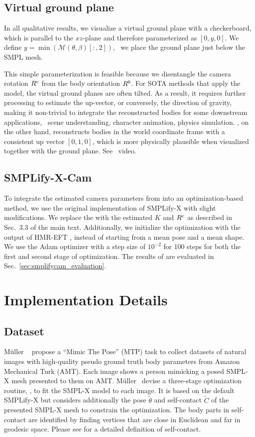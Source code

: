 \documentclass[10pt,twocolumn,letterpaper,usenames,dvipsnames]{article}
\begin{document}
\subsection{Virtual ground plane}
In all qualitative results, we visualize a virtual ground plane with a checkerboard, 
which is parallel to the $xz$-plane and therefore parameterized as $[0,y,0]$.
We define $y=\min\left(\mathcal{M}(\theta, \beta)[:,2]\right)$, \ie~we place the ground plane just below the SMPL mesh. 

This simple parameterization is feasible because we disentangle the camera rotation $R^c$ from the body orientation $R^b$.
For SOTA methods that apply the \iwcam model, the virtual ground planes are often tilted.
As a result, it requires further processing to estimate the up-vector, or conversely, the direction of gravity, 
making it non-trivial to integrate the reconstructed bodies for some downstream applications, \eg~scene understanding, character animation, physics simulation. 
\methodname, on the other hand, reconstructs bodies in the world coordinate frame with a consistent up vector $[0,1,0]$, 
which is more physically plausible when visualized together with the ground plane. See \supmat~video.

\subsection{SMPLify-X-Cam} 
To integrate the estimated camera parameters from \camcalib into an optimization-based method, 
we use the original implementation of SMPLify-X \cite{SMPL-X:2019} with slight modifications. 
We replace the \iwcam with the estimated $K$ and $R^c$ as described in Sec.~3.3 of the main text.
Additionally, we initialize the optimization with the output of HMR-EFT \cite{joo2020eft}, instead of starting from a mean pose and a mean shape.
We use the Adam optimizer with a step size of $10^{-2}$ for 100 steps for both the first and second stage of optimization.
The results of \smplify are evaluated in Sec.~\ref{sec:smplifycam_evaluation}.

\section{Implementation Details}
\subsection{\mtpcam Dataset}
M\"uller \etal~\cite{Mueller:CVPR:21} propose a ``Mimic The Pose'' (MTP) task 
to collect datasets of natural images with high-quality pseudo ground truth body parameters from Amazon Mechanical Turk (AMT).
Each image shows a person mimicking a posed SMPL-X mesh presented to them on AMT. 
M\"uller \etal~devise a three-stage optimization routine, \smplifyxc, to fit the SMPL-X model to each image. 
It is based on the default SMPLify-X \cite{SMPL-X:2019} but considers additionally the pose $\tilde{\theta}$ and self-contact $\tilde{C}$ of the presented SMPL-X mesh to constrain the optimization. 
The body parts in self-contact are identified by finding vertices that are close in Euclidean and far in geodesic space. 
Please see \cite{Mueller:CVPR:21} for a detailed definition of self-contact.
\end{document}
